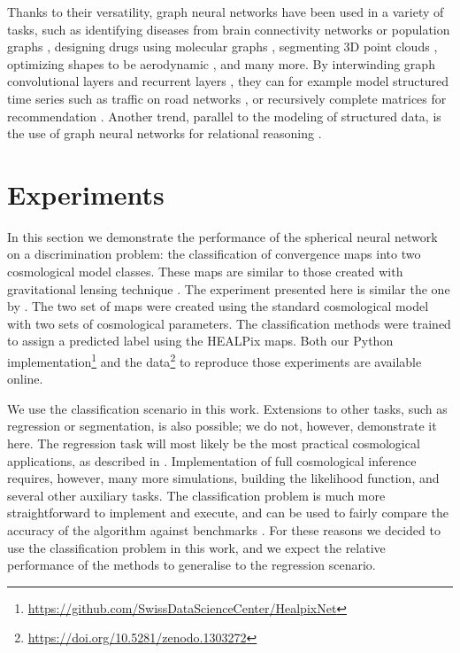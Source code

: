 \documentclass[final,twocolumn,3p,times,authoryear]{elsarticle}
\newcommand{\1}{\b{1}}              %
\newcommand{\0}{\b{0}}              %
\begin{document}

Thanks to their versatility, graph neural networks have been used in a variety of tasks, such as identifying diseases from brain connectivity networks \citep{ktena2018metriclearning} or population graphs \citep{parisot2017disease}, designing drugs using molecular graphs \citep{hop2018drugdesign}, segmenting 3D point clouds \citep{qi2017pointcloudsegmentation}, optimizing shapes to be aerodynamic \citep{baque2018shape}, and many more.
By interwinding graph convolutional layers and recurrent layers \citep{seo2016gcrn}, they can for example model structured time series such as traffic on road networks \citep{li2018traffic}, or recursively complete matrices for recommendation \citep{monti2017recommendation}.
Another trend, parallel to the modeling of structured data, is the use of graph neural networks for relational reasoning \citep{battaglia2018review}.

\section{Experiments}
\label{sec:experiments}

In this section we demonstrate the performance of the spherical neural network on a discrimination problem: the classification of convergence maps into two cosmological model classes.
These maps are similar to those created with gravitational lensing technique \citep{chang2017curvedsky}.
The experiment presented here is similar the one by \citet{schmelze2017cosmologicalmodel}.
The two set of maps were created using the standard cosmological model with two sets of cosmological parameters.
The classification methods were trained to assign a predicted label using the HEALPix maps.
Both our Python implementation\footnote{\url{https://github.com/SwissDataScienceCenter/HealpixNet}} and the data\footnote{\url{https://doi.org/10.5281/zenodo.1303272}} to reproduce those experiments are available online.

We use the classification scenario in this work.
Extensions to other tasks, such as regression or segmentation, is also possible; we do not, however, demonstrate it here.
The regression task will most likely be the most practical cosmological applications, as described in \citep{gupta2018nongaussianinformation,fluri2018deep}.
Implementation of full cosmological inference requires, however, many more simulations, building the likelihood function, and several other auxiliary tasks.
The classification problem is much more straightforward to implement and execute, and can be used to fairly compare the accuracy of the algorithm against benchmarks \citep{schmelze2017cosmologicalmodel}.
For these reasons we decided to use the classification problem in this work, and we expect the relative performance of the methods to generalise to the regression scenario.
\end{document}

